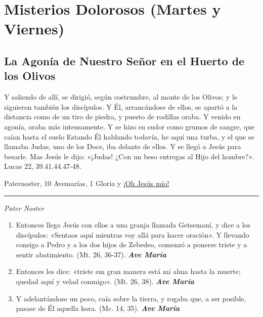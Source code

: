 \documentclass[a4paper,11pt, oneside]{report}
\begin{document}
\section*{Misterios Dolorosos (Martes y Viernes)}\label{sec:dolorosos}
{  
  \subsection*{La Agonía de Nuestro Señor en el Huerto de los Olivos}
    {
      
        Y saliendo de allí, se dirigió, según costrumbre, al monte de los Olivos; y le siguieron también los discípulos.
        Y Él, arrancándose de ellos, se apartó a la distancia como de un tiro de piedra, y puesto de rodillas oraba. 
        Y venido en agonía, oraba más intensamente. Y se hizo su sudor como grumos de sangre, que caían hasta el suelo
        Estando Él hablando todavía, he aquí una turba, y el que se llamaba Judas, uno de los Doce, iba delante de ellos. Y se llegó a Jesús para besarle.
        Mas Jesús le dijo: «¡Judas! ¿Con un beso entregas al Hijo del hombre?». Lucas 22, 39.41.44.47-48.
        

       Paternoster, 10 Avemarías, 1 Gloria y \hyperlink{finalHuerto}{¡Oh Jesús mío!}

      \medskip

      \begin{center}\rule{1\linewidth}{\linethickness}\end{center}

      \medskip
      \textit{Pater Noster}
    
      \begin{enumerate}

        \item Entonces llego Jesús con ellos a una granja llamada Getsemaní, y dice a los discípulos: «Sentaos aquí mientras voy allá para hacer oración». 
        Y llevando consigo a Pedro y a los dos hijos de Zebedeo, comenzó a ponerse triste y a sentir abatimiento. (Mt. 26, 36-37). \textbf{\textit{Ave María}}

        \item Entonces les dice: «triste em gran manera está mi alma hasta la muerte; quedad aquí y velad conmigo». (Mt. 26, 38). \textbf{\textit{Ave María}}

        \item Y adelantándose un poco, caía sobre la tierra, y rogaba que, a ser posible, pasase de Él aquella hora. (Mc. 14, 35). \textbf{\textit{Ave María}}


\end{enumerate}}}
\end{document}
